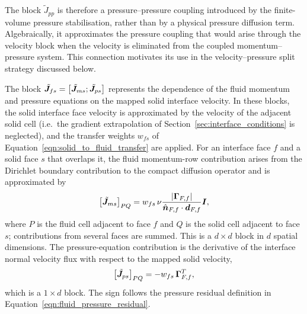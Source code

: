 The block $\tilde{J}_{pp}$ is therefore a pressure--pressure coupling
introduced by the finite-volume pressure stabilisation, rather than by a
physical pressure diffusion term.
Algebraically, it approximates the pressure coupling that would arise through the velocity block when the velocity is
eliminated from the coupled momentum--pressure system.
This connection motivates its use in the velocity--pressure split strategy discussed below.

The block
$\tilde{\boldsymbol{J}}_{fs}
=
\left[\tilde{\boldsymbol{J}}_{ms};\tilde{\boldsymbol{J}}_{ps}\right]$
represents the dependence of the fluid momentum and pressure equations on the
mapped solid interface velocity. In these blocks, the solid interface face
velocity is approximated by the velocity of the adjacent solid cell (i.e.\ the
gradient extrapolation of Section~\ref{sec:interface_conditions} is neglected),
and the transfer weights $w_{fs}$ of
Equation~\eqref{eqn:solid_to_fluid_transfer} are applied. For an interface
face $f$ and a solid face $s$ that overlaps it, the fluid
momentum-row contribution arises from the Dirichlet boundary contribution to
the compact diffusion operator and is approximated by
\begin{equation}
    \left[\tilde{\boldsymbol{J}}_{ms}\right]_{P Q}
    =
    w_{fs}\,
    \nu
    \frac{|\boldsymbol{\Gamma}_{F,f}|}
         {\hat{\boldsymbol{n}}_{F,f} \cdot \boldsymbol{d}_{F,f}}
    \boldsymbol{I},
    \label{eqn:fluid_solid_velocity_momentum_coupling}
\end{equation}
where $P$ is the fluid cell adjacent to face $f$ and $Q$ is the solid cell
adjacent to face $s$; contributions from several faces are summed. This is a
$d\times d$ block in $d$ spatial dimensions. The
pressure-equation contribution is the derivative of the interface normal
velocity flux with respect to the mapped solid velocity,
\begin{equation}
    \left[\tilde{\boldsymbol{J}}_{ps}\right]_{P Q}
    =
    -
    w_{fs}\,
    \boldsymbol{\Gamma}_{F,f}^{T},
    \label{eqn:fluid_solid_velocity_pressure_coupling}
\end{equation}
which is a $1\times d$ block. The sign follows the pressure residual definition
in Equation~\eqref{eqn:fluid_pressure_residual}.

